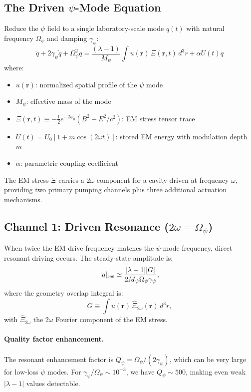 \documentclass[aps,prd,twocolumn,superscriptaddress,floatfix,nofootinbib]{revtex4-2}
\newcommand{\Opsi}{\Omega_\psi}
\newcommand{\gpsi}{\gamma_\psi}
\newcommand{\Mpsi}{M_\psi}
\newcommand{\lam}{\lambda}
\begin{document}
\subsection{The Driven $\psi$-Mode Equation}\label{sec:mode-eq}

Reduce the $\psi$ field to a single laboratory-scale mode $q(t)$ with
natural frequency $\Opsi$ and damping $\gpsi$:
\begin{equation}
\boxed{
\ddot{q} + 2\gpsi\dot{q} + \Opsi^2 q
= \frac{(\lam - 1)}{\Mpsi}\int u(\mathbf{r})\,\Xi(\mathbf{r},t)\,d^3r
+ \alpha U(t)q
}
\label{eq:driven-mode}
\end{equation}
where:
\begin{itemize}[nosep]
\item $u(\mathbf{r})$: normalized spatial profile of the $\psi$ mode
\item $\Mpsi$: effective mass of the mode
\item $\Xi(\mathbf{r},t) \equiv -\frac{1}{2}e^{-2\psi_0}
\left(B^2 - E^2/c^2\right)$: EM stress tensor trace
\item $U(t) = U_0[1 + m\cos(2\omega t)]$: stored EM energy with
modulation depth $m$
\item $\alpha$: parametric coupling coefficient
\end{itemize}

The EM stress $\Xi$ carries a $2\omega$ component for a cavity driven at
frequency $\omega$, providing two primary pumping channels plus three
additional actuation mechanisms.

\subsection{Channel 1: Driven Resonance ($2\omega = \Opsi$)}

When twice the EM drive frequency matches the $\psi$-mode frequency,
direct resonant driving occurs. The steady-state amplitude is:
\begin{equation}
|q|_{\rm res} \simeq \frac{|\lam - 1||G|}{2\Mpsi\Opsi\gpsi},
\label{eq:driven-amp}
\end{equation}
where the geometry overlap integral is:
\begin{equation}
G \equiv \int u(\mathbf{r})\,\hat{\Xi}_{2\omega}(\mathbf{r})\,d^3r,
\label{eq:G-overlap}
\end{equation}
with $\hat{\Xi}_{2\omega}$ the $2\omega$ Fourier component of the EM
stress.

\paragraph{Quality factor enhancement.}
The resonant enhancement factor is $Q_\psi = \Opsi/(2\gpsi)$, which can
be very large for low-loss $\psi$ modes. For
$\gpsi/\Opsi \sim 10^{-3}$, we have $Q_\psi \sim 500$, making even
weak $|\lambda - 1|$ values detectable.
\end{document}
